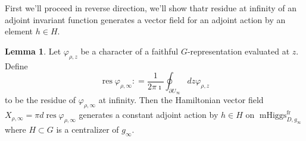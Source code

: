 \documentclass[11pt, oneside, reqno]{amsart}
\theoremstyle{definition} \newtheorem{definition}{Definition}[section]
\newtheorem{lemma}[definition]{Lemma}
\theoremstyle{definition} \newtheorem{remark}[definition]{Remark}
\theoremstyle{definition} \newtheorem{remarks}[definition]{Remarks}
\theoremstyle{definition} \newtheorem{question}[definition]{Question}
\theoremstyle{definition} \newtheorem*{note}{Note}
\theoremstyle{definition} \newtheorem{example}[definition]{Example}
\theoremstyle{definition} \newtheorem{examples}[definition]{Examples}
\DeclareMathOperator{\res}{res}
\DeclareMathOperator{\mhiggs}{mHiggs}
\newcommand{\fr}{\mathrm{fr}}
\begin{document}
 First we'll proceed in reverse direction, we'll show
 thatr residue at infinity of an adjoint invariant function generates a
 vector field for an adjoint action by an element $h \in H$. 
 \begin{lemma} Let $\varphi_{\rho, z}$ be a character of a faithful $G$-representation evaluated at $z$. Define
   \begin{equation}
    \res  \varphi_{\rho, \infty} : = \frac{1}{2 \pi \imath} \oint_{\partial U_{\infty}}  dz \varphi_{\rho, z} 
   \end{equation}
   to be the residue of $\varphi_{\rho, \infty}$ at infinity. 
   Then the Hamiltonian vector field  $X_{\rho, \infty} = \pi d \res \varphi_{\rho, \infty}$
   generates a constant adjoint action by $h \in H$ on $\mhiggs^{\fr}_{D, g_\infty}$
   where $H \subset G$ is a centralizer of $g_\infty$. 
 \end{lemma}
\end{document}

